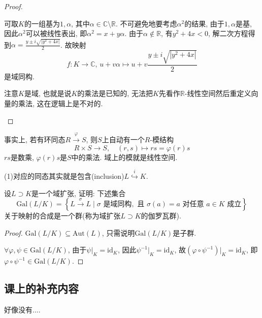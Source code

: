 \documentclass{../solutions-cn}
\begin{document}
\begin{proof}
\begin{enumerate}[(1)]
        可取$K$的一组基为$1, \alpha$, 其中$\alpha \in \mathbb{C} \setminus \mathbb{R}$. 不可避免地要考虑$\alpha^2$的结果, 由于$1, \alpha$是基, 因此$\alpha^2$可以被线性表出, 即$\alpha^2 = x + y\alpha$. 由于$\alpha \notin \mathbb{R}$, 有$y^2 + 4x < 0$, 解二次方程得到$\alpha = \frac{y \pm i\sqrt{|y^2 + 4x|}}{2}$. 故映射
        \[
            f: K \to \mathbb{C},\, u + v\alpha \mapsto u + v\frac{y \pm i\sqrt{|y^2 + 4x|}}{2}
        \]
        是域同构.
        
        注意$K$是域, 也就是说$K$的乘法是已知的, 无法把$K$先看作$\mathbb{R}$-线性空间然后重定义向量的乘法, 这在逻辑上是不对的.
    \end{enumerate}
\end{proof}

\begin{remark}
    事实上, 若有环同态$R \overset{\varphi}\to S$, 则$S$上自动有一个$R$-模结构
    \[
        R \times S \to S, \quad (r, s) \mapsto rs = \varphi(r)s
    \]
    $rs$是数乘, $\varphi(r)s$是$S$中的乘法. 域上的模就是线性空间.
    
    (1)对应的同态其实就是包含(inclusion)$L \overset{i}\hookrightarrow K$.
\end{remark}

\begin{exercise}[习题1.4.11]
    设$L \supset K$是一个域扩张, 证明: 下述集合
    \[
        \mathrm{Gal}(L/K) = \left\{L \xrightarrow{\sigma} L \mid \sigma\text{ 是域同构},\text{ 且 } \sigma(a) = a \text{ 对任意 } a \in K \text{ 成立}\right\}
    \]
    关于映射的合成是一个群(称为域扩张$L\supset K$的伽罗瓦群).
\end{exercise}

\begin{proof}
    $\mathrm{Gal}(L/K) \subseteq \mathrm{Aut}(L)$, 只需说明$\mathrm{Gal}(L/K)$是子群.

    $\forall \varphi, \psi \in \mathrm{Gal}(L/K)$, 由于$\psi|_K = \mathrm{id}_K$, 因此$\psi^{-1}|_K = \mathrm{id}_K$, 故$(\varphi \circ \psi^{-1})|_K = \mathrm{id}_K$, 即$\varphi \circ \psi^{-1} \in \mathrm{Gal}(L/K)$.
\end{proof}

\subsection*{课上的补充内容}
好像没有....
\end{document}
